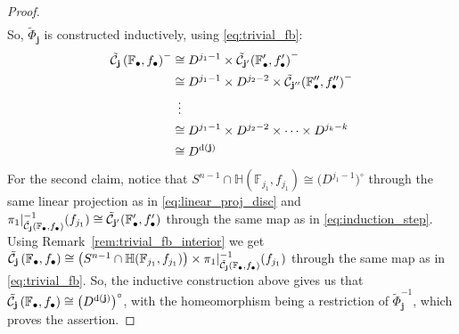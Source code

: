 \begin{proof}
\begin{align*}
\end{align*}
So, $\tilde{\Phi}_{\mathbf{j}}$ is constructed inductively, using \eqref{eq:trivial_fb}:
\begin{align*}
\tilde{\mathcal{C}}_{\mathbf{j}}\left(\mathbb{F}_{\bullet},f_{\bullet}\right)^-&\cong D^{j_1-1}\times\tilde{\mathcal{C}}_{\mathbf{j}'}{\left(\mathbb{F}_{\bullet}',f_{\bullet}'\right)}^-\\
&\cong D^{j_1-1}\times D^{j_2-2}\times \tilde{\mathcal{C}}_{\mathbf{j}''}{\left(\mathbb{F}_{\bullet}'',f_{\bullet}''\right)}^-\\
&\ \,\vdots\\
&\cong D^{j_1-1}\times D^{j_2-2}\times\cdots\times D^{j_k-k}\\
&\cong D^{\mathrm{d}(\mathbf{j})}
\end{align*}
For the second claim, notice that
$S^{n-1}\cap\mathbb{H}(\mathbb{F}_{j_1},f_{j_1})\cong\big(D^{j_1-1}\big)^{\circ}$
through the same linear projection as in \eqref{eq:linear_proj_disc} and
$\pi_1|_{\tilde{\mathcal{C}}_{\mathbf{j}}\left(\mathbb{F}_{\bullet},f_{\bullet}\right)}^{-1}(f_{j_1})\cong\tilde{\mathcal{C}}_{\mathbf{j}'}(\mathbb{F}_{\bullet}',f_{\bullet}')$
through the same map as in \eqref{eq:induction_step}. Using Remark~\ref{rem:trivial_fb_interior} we get
$\tilde{\mathcal{C}}_{\mathbf{j}}\left(\mathbb{F}_{\bullet},f_{\bullet}\right)\cong\big(S^{n-1}\cap\mathbb{H}(\mathbb{F}_{j_1},f_{j_1})\big)\times\pi_1|_{\tilde{\mathcal{C}}_{\mathbf{j}}\left(\mathbb{F}_{\bullet},f_{\bullet}\right)}^{-1}(f_{j_1})$
through the same map as in \eqref{eq:trivial_fb}.
So, the inductive construction above gives us that
$\tilde{\mathcal{C}}_{\mathbf{j}}\left(\mathbb{F}_{\bullet},f_{\bullet}\right)\cong\big(D^{\mathrm{d}(\mathbf{j})}\big)^{\circ}$,
with the homeomorphism being a restriction of $\tilde{\Phi}_{\mathbf{j}}^{-1}$, which proves the assertion.
\end{proof}

